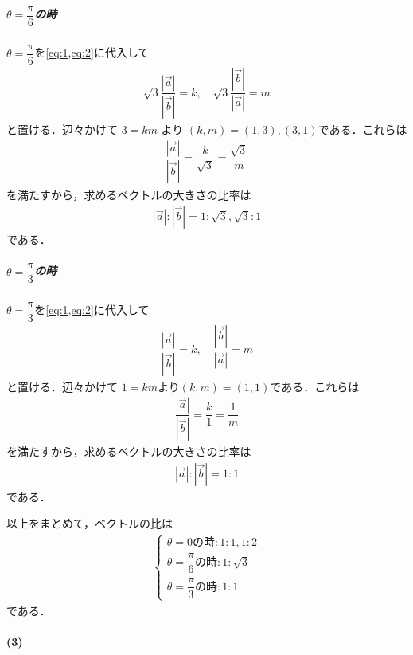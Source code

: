\documentclass[../../main.tex]{subfiles}
\begin{document}
\subparagraph{$\theta=\dfrac{\pi}{6}$の時}

$\theta=\dfrac{\pi}{6}$を\cref{eq:1,eq:2}に代入して
\begin{align}
  \sqrt{3} \dfrac{|\vec{a}|}{|\vec{b}|} = k, \quad \sqrt{3} \dfrac{|\vec{b}|}{|\vec{a}|} = m
\end{align}
と置ける．辺々かけて $3 = km$ より $(k, m) = (1, 3), (3, 1)$である．これらは
\begin{align}
  \dfrac{|\vec{a}|}{|\vec{b}|} = \dfrac{k}{\sqrt{3}} = \dfrac{\sqrt{3}}{m}
\end{align}
を満たすから，求めるベクトルの大きさの比率は
\begin{align}
  |\vec{a}| : |\vec{b}| = 1 : \sqrt{3}, \sqrt{3}: 1
\end{align}
である．

\subparagraph{$\theta=\dfrac{\pi}{3}$の時}

$\theta=\dfrac{\pi}{3}$を\cref{eq:1,eq:2}に代入して
\begin{align}
  \dfrac{|\vec{a}|}{|\vec{b}|} = k, \quad \dfrac{|\vec{b}|}{|\vec{a}|} = m
\end{align}
と置ける．辺々かけて $1 = km$より$(k,m)=(1,1)$である．これらは
\begin{align}
  \dfrac{|\vec{a}|}{|\vec{b}|} = \dfrac{k}{1} = \dfrac{1}{m}
\end{align}
を満たすから，求めるベクトルの大きさの比率は
\begin{align}
  |\vec{a}| : |\vec{b}| = 1 : 1
\end{align}
である．
\casesend

以上をまとめて，ベクトルの比は
\begin{align}
  \begin{cases}
    \theta=0 \text{の時}: 1:1, 1:2 \\
    \theta=\dfrac{\pi}{6} \text{の時}: 1:\sqrt{3} \\
    \theta=\dfrac{\pi}{3} \text{の時}: 1:1
  \end{cases}
\end{align}
である．

\paragraph{(3)}
\end{document}

